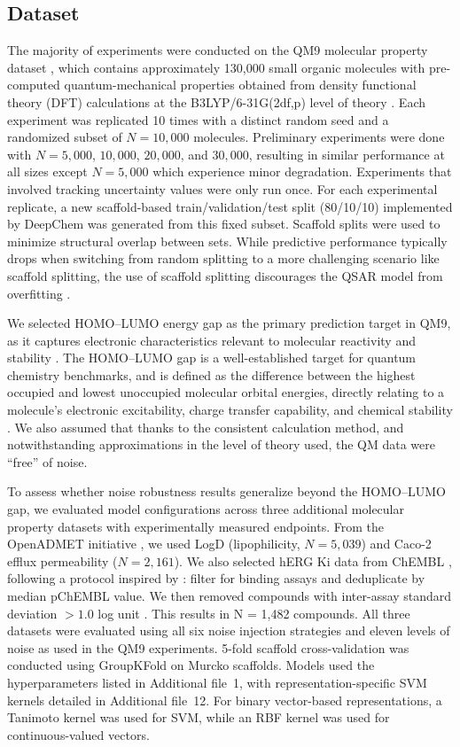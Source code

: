 \documentclass[pdflatex,sn-basic]{sn-jnl}%
\theoremstyle{thmstyleone}%
\theoremstyle{thmstyletwo}%
\theoremstyle{thmstylethree}%
\begin{document}
\subsection{Dataset}
The majority of experiments were conducted on the QM9 molecular property dataset \citep{Ramakrishnan2014}, which contains approximately 130,000 small organic molecules with pre-computed quantum-mechanical properties obtained from density functional theory (DFT) calculations at the B3LYP/6-31G(2df,p) level of theory \citep{Ramakrishnan2014}. Each experiment was replicated 10 times with a distinct random seed and a randomized subset of $N = 10{,}000$ molecules. Preliminary experiments were done with $N = 5{,}000$, $10{,}000$, $20{,}000$, and $30{,}000$, resulting in similar performance at all sizes except $N = 5{,}000$ which experience minor degradation. Experiments that involved tracking uncertainty values were only run once. For each experimental replicate, a new scaffold-based train/validation/test split (80/10/10) implemented by DeepChem \citep{deepchem} was generated from this fixed subset. Scaffold splits were used to minimize structural overlap between sets. While predictive performance typically drops when switching from random splitting to a more challenging scenario like scaffold splitting, the use of scaffold splitting discourages the QSAR model from overfitting \citep{Heid2023}.

We selected HOMO--LUMO energy gap as the primary prediction target in QM9, as it captures electronic characteristics relevant to molecular reactivity and stability \citep{Islam2019, Hllermeier2021}. The HOMO--LUMO gap is a well-established target for quantum chemistry benchmarks, and is defined as the difference between the highest occupied and lowest unoccupied molecular orbital energies, directly relating to a molecule's electronic excitability, charge transfer capability, and chemical stability \citep{Fediai2023}. We also assumed that thanks to the consistent calculation method, and notwithstanding approximations in the level of theory used, the QM data were ``free'' of noise.

To assess whether noise robustness results generalize beyond the HOMO--LUMO gap, we evaluated model configurations across three additional molecular property datasets with experimentally measured endpoints. From the OpenADMET initiative \citep{openadmet}, we used LogD (lipophilicity, $N = 5{,}039$) and Caco-2 efflux permeability ($N = 2{,}161$). We also selected hERG Ki data from ChEMBL \citep{Zdrazil2023}, following a protocol inspired by \citet{landrum2024}: filter for binding assays and deduplicate by median pChEMBL value. We then removed compounds with inter-assay standard deviation $> 1.0$ log unit \citep{Zdrazil2023}. This results in N = 1,482 compounds. All three datasets were evaluated using all six noise injection strategies and eleven levels of noise as used in the QM9 experiments. 5-fold scaffold cross-validation was conducted using GroupKFold on Murcko scaffolds. Models used the hyperparameters listed in Additional file~1, with representation-specific SVM kernels detailed in Additional file~12. For binary vector-based representations, a Tanimoto kernel was used for SVM, while an RBF kernel was used for continuous-valued vectors. 
\end{document}
